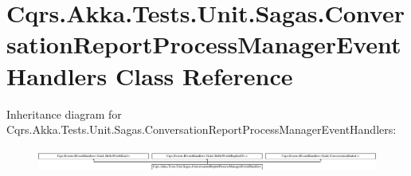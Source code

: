 \hypertarget{classCqrs_1_1Akka_1_1Tests_1_1Unit_1_1Sagas_1_1ConversationReportProcessManagerEventHandlers}{}\section{Cqrs.\+Akka.\+Tests.\+Unit.\+Sagas.\+Conversation\+Report\+Process\+Manager\+Event\+Handlers Class Reference}
\label{classCqrs_1_1Akka_1_1Tests_1_1Unit_1_1Sagas_1_1ConversationReportProcessManagerEventHandlers}
Inheritance diagram for Cqrs.\+Akka.\+Tests.\+Unit.\+Sagas.\+Conversation\+Report\+Process\+Manager\+Event\+Handlers\+:\begin{figure}[H]
\begin{center}
\leavevmode
\includegraphics[height=0.792640cm]{classCqrs_1_1Akka_1_1Tests_1_1Unit_1_1Sagas_1_1ConversationReportProcessManagerEventHandlers}
\end{center}
\end{figure}
